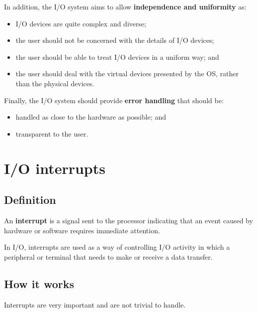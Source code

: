 \documentclass[a4paper]{systems-software}
\begin{document}
In addition, the I/O system aims to allow \textbf{independence and uniformity} as:
\begin{itemize}
	\item I/O devices are quite complex and diverse;
	\item the user should not be concerned with the details of I/O devices;
	\item the user should be able to treat I/O devices in a uniform way; and
	\item the user should deal with the virtual devices presented by the OS, rather than the physical devices.
\end{itemize}

Finally, the I/O system should provide \textbf{error handling} that should be:
\begin{itemize}
	\item handled as close to the hardware as possible; and
	\item transparent to the user.
\end{itemize}


\section*{I/O interrupts}

\subsection*{Definition}

An \textbf{interrupt} is a signal sent to the processor indicating that an event caused by hardware or software requires immediate attention.

In I/O, interrupts are used as a way of controlling I/O activity in which a peripheral or terminal that needs to make or receive a data transfer.


\newpage

\subsection*{How it works}

Interrupts are very important and are not trivial to handle.
\end{document}
